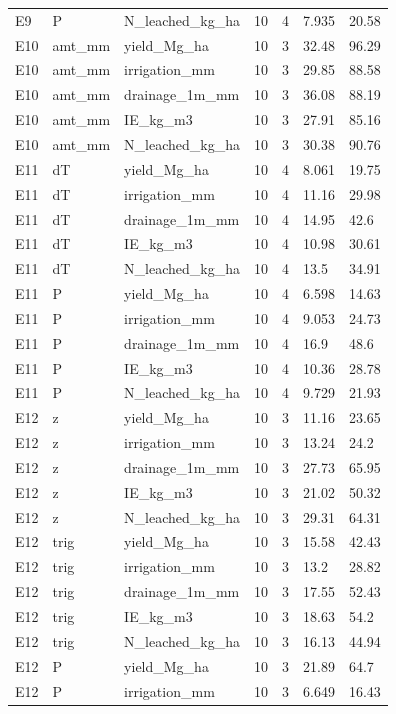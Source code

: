 {\begin{longtable}
{}E9 & P & N\_leached\_kg\_ha & 10 & 4 & 7.935 & 20.58\\
{}E10 & amt\_mm & yield\_Mg\_ha & 10 & 3 & 32.48 & 96.29\\
{}E10 & amt\_mm & irrigation\_mm & 10 & 3 & 29.85 & 88.58\\
{}E10 & amt\_mm & drainage\_1m\_mm & 10 & 3 & 36.08 & 88.19\\
{}E10 & amt\_mm & IE\_kg\_m3 & 10 & 3 & 27.91 & 85.16\\
{}E10 & amt\_mm & N\_leached\_kg\_ha & 10 & 3 & 30.38 & 90.76\\
{}E11 & dT & yield\_Mg\_ha & 10 & 4 & 8.061 & 19.75\\
{}E11 & dT & irrigation\_mm & 10 & 4 & 11.16 & 29.98\\
{}E11 & dT & drainage\_1m\_mm & 10 & 4 & 14.95 & 42.6\\
{}E11 & dT & IE\_kg\_m3 & 10 & 4 & 10.98 & 30.61\\
{}E11 & dT & N\_leached\_kg\_ha & 10 & 4 & 13.5 & 34.91\\
{}E11 & P & yield\_Mg\_ha & 10 & 4 & 6.598 & 14.63\\
{}E11 & P & irrigation\_mm & 10 & 4 & 9.053 & 24.73\\
{}E11 & P & drainage\_1m\_mm & 10 & 4 & 16.9 & 48.6\\
{}E11 & P & IE\_kg\_m3 & 10 & 4 & 10.36 & 28.78\\
{}E11 & P & N\_leached\_kg\_ha & 10 & 4 & 9.729 & 21.93\\
{}E12 & z & yield\_Mg\_ha & 10 & 3 & 11.16 & 23.65\\
{}E12 & z & irrigation\_mm & 10 & 3 & 13.24 & 24.2\\
{}E12 & z & drainage\_1m\_mm & 10 & 3 & 27.73 & 65.95\\
{}E12 & z & IE\_kg\_m3 & 10 & 3 & 21.02 & 50.32\\
{}E12 & z & N\_leached\_kg\_ha & 10 & 3 & 29.31 & 64.31\\
{}E12 & trig & yield\_Mg\_ha & 10 & 3 & 15.58 & 42.43\\
{}E12 & trig & irrigation\_mm & 10 & 3 & 13.2 & 28.82\\
{}E12 & trig & drainage\_1m\_mm & 10 & 3 & 17.55 & 52.43\\
{}E12 & trig & IE\_kg\_m3 & 10 & 3 & 18.63 & 54.2\\
{}E12 & trig & N\_leached\_kg\_ha & 10 & 3 & 16.13 & 44.94\\
{}E12 & P & yield\_Mg\_ha & 10 & 3 & 21.89 & 64.7\\
{}E12 & P & irrigation\_mm & 10 & 3 & 6.649 & 16.43\\

\end{longtable}}
